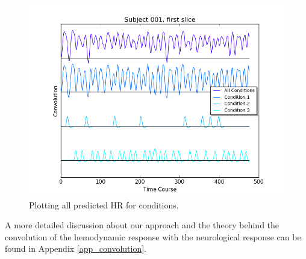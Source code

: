 \begin{figure}[ht]
\centering
\includegraphics[scale=.5]{../images/all_cond_time}  
\caption{Plotting all predicted HR for conditions.}
\label{fig:all_cond_time}
\end{figure}

\par A more detailed discussion about our approach and the theory behind the 
convolution of the hemodynamic response with the neurological response 
can be found in Appendix \ref{app_convolution}.

